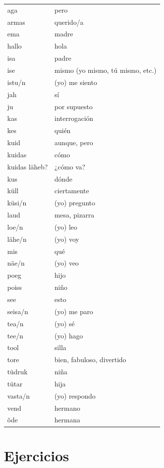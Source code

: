 \begin{tabular}{ l l }
	aga				& pero \\
	armas			& querido/a \\
	ema				& madre \\
	hallo			& hola \\
	isa				& padre \\
	ise				& mismo (yo mismo, tú mismo, etc.) \\
	istu/n			& (yo) me siento  \\
	jah				& sí \\
	ju				& por supuesto \\
	kas				& interrogación \\
	kes				& quién \\
	kuid			& aunque, pero \\
	kuidas			& cómo \\
	kuidas läheb?	& ¿cómo va? \\
	kus				& dónde \\
	küll			& ciertamente \\
	küsi/n			& (yo) pregunto \\
	laud			& mesa, pizarra \\
	loe/n			& (yo) leo \\
	lähe/n			& (yo) voy \\
	mis				& qué \\
	näe/n			& (yo) veo \\
	poeg			& hijo \\
	poiss			& niño \\
	see				& esto \\
	seisa/n			& (yo) me paro \\
	tea/n			& (yo) sé \\
	tee/n			& (yo) hago \\
	tool			& silla \\
	tore			& bien, fabuloso, divertido \\
	tüdruk			& niña \\
	tütar			& hija \\
	vasta/n			& (yo) respondo \\
	vend			& hermano \\
	õde				& hermana
\end{tabular}

\Large{\section*{Ejercicios}}

